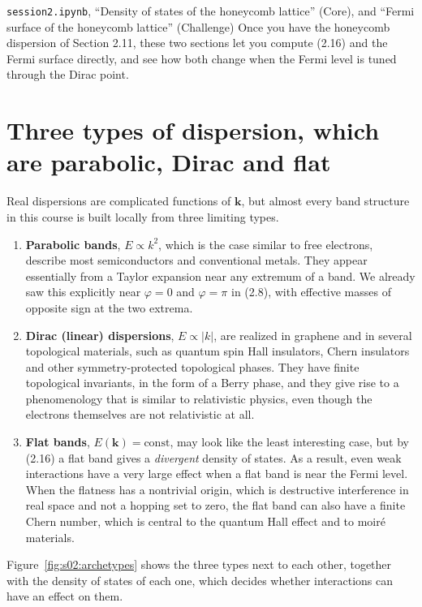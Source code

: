 \begin{notebookbox}{\texttt{session2.ipynb}, ``Density of states of the honeycomb lattice'' (Core), and ``Fermi surface of the honeycomb lattice'' (Challenge)}
Once you have the honeycomb dispersion of Section 2.11, these two sections let you compute (2.16)
and the Fermi surface directly, and see how both change when the Fermi level is tuned through the
Dirac point.
\end{notebookbox}

\section{Three types of dispersion, which are parabolic, Dirac and flat}

Real dispersions are complicated functions of $\mathbf{k}$, but almost every band structure in this
course is built locally from three limiting types.

\begin{enumerate}
\item \textbf{Parabolic bands}, $E\propto k^2$, which is the case similar to free electrons, describe
   most semiconductors and conventional metals. They appear essentially from a Taylor expansion near
   any extremum of a band. We already saw this explicitly near $\varphi=0$ and $\varphi=\pi$ in (2.8),
   with effective masses of opposite sign at the two extrema.
\item \textbf{Dirac (linear) dispersions}, $E\propto|k|$, are realized in graphene and in several
   topological materials, such as quantum spin Hall insulators, Chern insulators and other
   symmetry-protected topological phases. They have finite topological invariants, in the form of a
   Berry phase, and they give rise to a phenomenology that is similar to relativistic physics, even
   though the electrons themselves are not relativistic at all.
\item \textbf{Flat bands}, $E(\mathbf{k})=\text{const}$, may look like the least interesting case,
   but by (2.16) a flat band gives a \emph{divergent} density of states. As a result, even weak
   interactions have a very large effect when a flat band is near the Fermi level. When the flatness
   has a nontrivial origin, which is destructive interference in real space and not a hopping set to
   zero, the flat band can also have a finite Chern number, which is central to the quantum Hall effect
   and to moiré materials.
\end{enumerate}

Figure~\ref{fig:s02:archetypes} shows the three types next to each other, together with the density
of states of each one, which decides whether interactions can have an effect on them.

